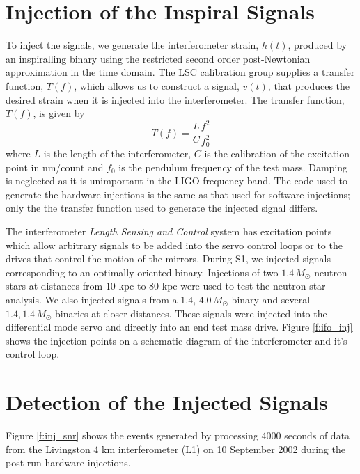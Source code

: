 \section{Injection of the Inspiral Signals}
\label{s:injecting}

To inject the signals, we generate the interferometer strain, $h(t)$, produced
by an inspiralling binary using the restricted second order post-Newtonian
approximation in the time domain\cite{Blanchet:1996pi}.  The LSC calibration group
supplies a transfer function, $T(f)$, which allows us to construct a signal,
$v(t)$, that produces the desired strain when it is injected into the
interferometer.  The transfer function, $T(f)$, is given by 
\begin{equation}
T(f) = \frac{L}{C}\frac{f^2}{f_0^2}
\end{equation}
where $L$ is the length of the interferometer, $C$ is the calibration of the
excitation point in nm/count and $f_0$ is the pendulum frequency of the test
mass. Damping is neglected as it is unimportant in the LIGO frequency band.
The code used to generate the hardware injections is the same as that used
for software injections; only the the transfer function used to generate the
injected signal differs.

The interferometer \emph{Length Sensing and Control} system
has excitation points which allow arbitrary signals to be added into the servo
control loops or to the drives that control the motion of the
mirrors\cite{LIGOS1instpaper}. 
During S1, we injected signals corresponding to an optimally oriented binary.
Injections of two $1.4\,M_\odot$ neutron stars at distances from $10$ kpc to
$80$ kpc were used to test the neutron star analysis. 
We also injected signals from a $1.4,\,4.0\,M_\odot$ binary and several
$1.4,1.4\,M_\odot$ binaries at closer distances.  These signals were injected
into the differential mode servo and directly into an end test mass drive.
Figure \ref{f:ifo_inj} shows the injection points on a schematic diagram of
the interferometer and it's control loop.

\section{Detection of the Injected Signals}
\label{s:detection}

Figure \ref{f:inj_snr} shows the events generated by processing 4000 seconds
of data from the Livingston 4 km interferometer (L1) on 10 September 2002
during the post-run hardware injections.


